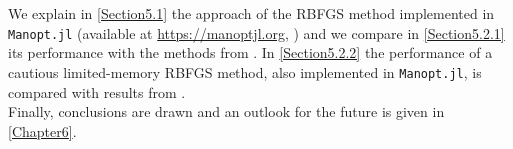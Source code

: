 We explain in \cref{Section5.1} the approach of the RBFGS method implemented in \lstinline!Manopt.jl! (available at \url{https://manoptjl.org}, \cite{Bergmann:2019}) and we compare in \cref{Section5.2.1} its performance with the methods from \cite{Qi:2011}. In \cref{Section5.2.2} the performance of a cautious limited-memory RBFGS method, also implemented in \lstinline!Manopt.jl!, is compared with results from \cite{HuangGallivanAbsil:2015}. \\
Finally, conclusions are drawn and an outlook for the future is given in \cref{Chapter6}.